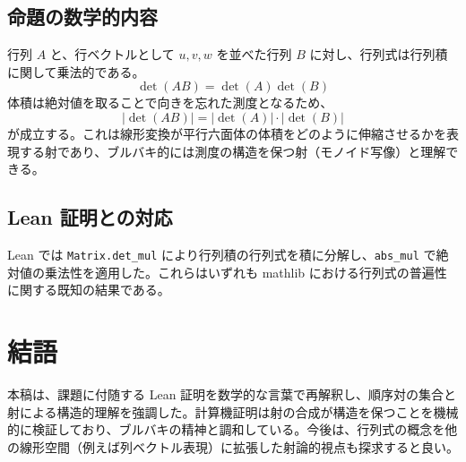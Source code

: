 \documentclass{ltjsarticle}
\begin{document}
\subsection{命題の数学的内容}
行列 $A$ と、行ベクトルとして $u,v,w$ を並べた行列 $B$ に対し、行列式は行列積に関して乗法的である。
\[
\det(AB) = \det(A)\det(B)
\]
体積は絶対値を取ることで向きを忘れた測度となるため、
\[
\lvert \det(AB) \rvert = \lvert \det(A) \rvert \cdot \lvert \det(B) \rvert
\]
が成立する。これは線形変換が平行六面体の体積をどのように伸縮させるかを表現する射であり、ブルバキ的には測度の構造を保つ射（モノイド写像）と理解できる。

\subsection{Lean 証明との対応}
Lean では \verb|Matrix.det_mul| により行列積の行列式を積に分解し、\verb|abs_mul| で絶対値の乗法性を適用した。これらはいずれも mathlib における行列式の普遍性に関する既知の結果である。

\section{結語}
本稿は、課題に付随する Lean 証明を数学的な言葉で再解釈し、順序対の集合と射による構造的理解を強調した。計算機証明は射の合成が構造を保つことを機械的に検証しており、ブルバキの精神と調和している。今後は、行列式の概念を他の線形空間（例えば列ベクトル表現）に拡張した射論的視点も探求すると良い。
\end{document}
